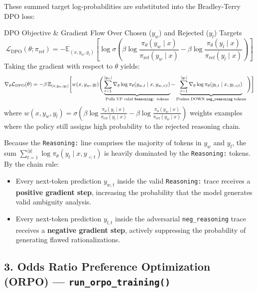 \documentclass[10pt,letterpaper]{article}
\begin{document}
These summed target log-probabilities are substituted into the Bradley-Terry DPO loss:

\begin{mathbox}{DPO Objective \& Gradient Flow Over Chosen ($y_w$) and Rejected ($y_l$) Targets}
\begin{equation}
\mathcal{L}_{\text{DPO}}(\theta; \pi_{\text{ref}}) = -\mathbb{E}_{(x, y_w, y_l)} \left[ \log \sigma \left( \beta \log \frac{\pi_\theta(y_w \mid x)}{\pi_{\text{ref}}(y_w \mid x)} - \beta \log \frac{\pi_\theta(y_l \mid x)}{\pi_{\text{ref}}(y_l \mid x)} \right) \right]
\end{equation}
Taking the gradient with respect to $\theta$ yields:
\begin{equation}
\nabla_\theta \mathcal{L}_{\text{DPO}}(\theta) = -\beta \, \mathbb{E}_{(x, y_w, y_l)} \Bigg[ w(x, y_w, y_l) \Bigg( \underbrace{\sum_{t=1}^{|y_w|} \nabla_\theta \log \pi_\theta(y_{w,t} \mid x, y_{w,<t})}_{\text{Pulls UP valid \texttt{Reasoning:} tokens}} - \underbrace{\sum_{t=1}^{|y_l|} \nabla_\theta \log \pi_\theta(y_{l,t} \mid x, y_{l,<t})}_{\text{Pushes DOWN \texttt{neg\_reasoning} tokens}} \Bigg) \Bigg]
\end{equation}
where $w(x, y_w, y_l) = \sigma\!\left(\beta \log \frac{\pi_\theta(y_l \mid x)}{\pi_{\text{ref}}(y_l \mid x)} - \beta \log \frac{\pi_\theta(y_w \mid x)}{\pi_{\text{ref}}(y_w \mid x)}\right)$ weights examples where the policy still assigns high probability to the rejected reasoning chain.
\end{mathbox}

Because the \texttt{Reasoning:} line comprises the majority of tokens in $y_w$ and $y_l$, the sum $\sum_{t=1}^{|y|} \log \pi_\theta(y_t \mid x, y_{<t})$ is heavily dominated by the \texttt{Reasoning:} tokens. By the chain rule:
\begin{itemize}[leftmargin=18pt, itemsep=2pt]
    \item Every next-token prediction $y_{w,t}$ inside the valid \texttt{Reasoning:} trace receives a \textbf{positive gradient step}, increasing the probability that the model generates valid ambiguity analysis.
    \item Every next-token prediction $y_{l,t}$ inside the adversarial \texttt{neg\_reasoning} trace receives a \textbf{negative gradient step}, actively suppressing the probability of generating flawed rationalizations.
\end{itemize}

\newpage
\subsection{3. Odds Ratio Preference Optimization (ORPO) --- \texttt{run\_orpo\_training()}}
\end{document}
